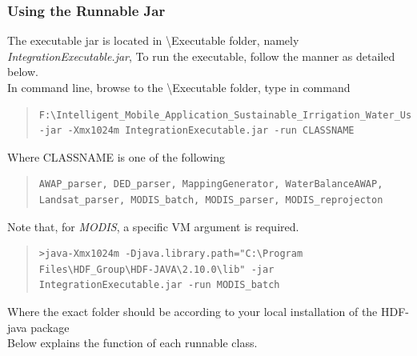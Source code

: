 \subsubsection{Using the Runnable Jar}\label{Section:Using the Runnable Jar}
The executable jar is located in \textbackslash Executable folder, namely \emph{IntegrationExecutable.jar}, To run the executable, follow the manner as detailed below.\\
\newline
In command line, browse to the \textbackslash Executable folder, type in command\\
\begin{quote}
\begin{lstlisting}
F:\Intelligent_Mobile_Application_Sustainable_Irrigation_Water_Usage_DSS\Executable>java -jar -Xmx1024m IntegrationExecutable.jar -run CLASSNAME
\end{lstlisting}
\end{quote}
Where CLASSNAME is one of the following
\begin{quote}
\begin{lstlisting}
AWAP_parser, DED_parser, MappingGenerator, WaterBalanceAWAP, Landsat_parser, MODIS_batch, MODIS_parser, MODIS_reprojecton
\end{lstlisting}
\end{quote}
Note that, for \emph{MODIS}, a specific VM argument is required.
\begin{quote}
\begin{lstlisting}
>java-Xmx1024m -Djava.library.path="C:\Program Files\HDF_Group\HDF-JAVA\2.10.0\lib" -jar IntegrationExecutable.jar -run MODIS_batch
\end{lstlisting}
\end{quote}
Where the exact folder should be according to your local installation of the HDF-java package\\
\newline
Below explains the function of each runnable class. 

